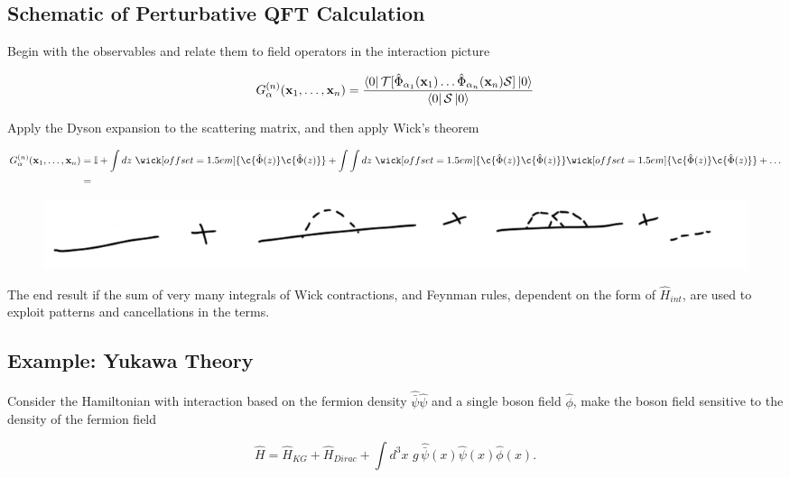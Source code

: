 \subsection*{Schematic of Perturbative QFT Calculation }

\noindent Begin with the observables and relate them to field operators in the interaction picture

\begin{equation}
G^{(n)}_\alpha (\textbf{x}_1, \dots, \textbf{x}_n) = \frac{\bra{0} \mathcal{T} [\hat{\Phi}_{\alpha_1} (\textbf{x}_1) \dots \hat{\Phi}_{\alpha_n} (\textbf{x}_n) \mathcal{S} ] \ket{0}}{\bra{0} \mathcal{S} \ket{0}}
\end{equation}

\noindent Apply the Dyson expansion to the scattering matrix, and then apply Wick's theorem

\begin{align}
G^{(n)}_\alpha (\textbf{x}_1, \dots, \textbf{x}_n) &= \mathbb{I} + \int dz \,\, \wick[offset=1.5em]{\c {\hat{\Phi}(z)} \c {\hat{\Phi}(z)}} + \int\int dz \,\, \wick[offset=1.5em]{\c {\hat{\Phi}(z)} \c {\hat{\Phi}(z)}} \wick[offset=1.5em]{\c {\hat{\Phi}(z)} \c {\hat{\Phi}(z)}} + \dots \\
&=
\end{align}

\begin{figure}[H]\centering \includegraphics[scale=0.4]{images/lots.png}  \end{figure}

\noindent The end result if the sum of very many integrals of Wick contractions, and Feynman rules, dependent on the form of $\hat{H}_{int}$, are used to exploit patterns and cancellations in the terms. 

\subsection*{Example: Yukawa Theory}

\noindent Consider the Hamiltonian with interaction based on the fermion density $\hat{\bar{\psi}} \hat{\psi}$ and a single boson field $\hat{\phi}$, make the boson field sensitive to the density of the fermion field

\begin{equation}
\hat{H} =\hat{H}_{KG} + \hat{H}_{Dirac} + \int d^3 x \,\, g \, \hat{\bar{\psi}}(x) \hat{\psi}(x) \hat{\phi}(x).
\end{equation}

